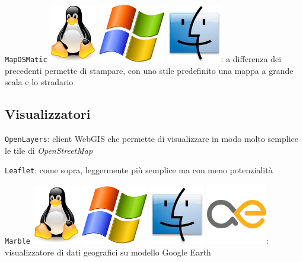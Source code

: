 \documentclass[a4paper,twoside,12pt,]{article}
\newcommand{\osm}{\emph{OpenStreetMap}\xspace}
\newcommand{\soft}[1]{\texttt{#1}}
\begin{document}
\soft{MapOSMatic} \includegraphics{./linux-logo.jpg} \includegraphics{./windows-logo.jpg} \includegraphics{./mac-logo.jpg}: a differenza dei precedenti permette di stampare, con uno stile predefinito una mappa a grande scala e lo stradario 

\subsection{Visualizzatori}

\soft{OpenLayers}: client WebGIS che permette di visualizzare in modo molto semplice le tile di \osm

\soft{Leaflet}: come sopra, leggermente più semplice ma con meno potenzialità

\soft{Marble} \includegraphics{./linux-logo.jpg} \includegraphics{./windows-logo.jpg} \includegraphics{./mac-logo.jpg} \includegraphics{./maemo-logo.png}: visualizzatore di dati geografici su modello Google Earth 
\end{document}

